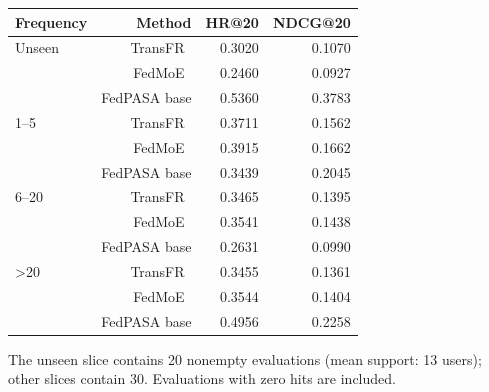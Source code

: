 
\par\noindent\begin{minipage}{\columnwidth}\centering\footnotesize
{}\label{tab:buckets}
\setlength{\tabcolsep}{2.5pt}
\begin{tabular*}{\linewidth}{@{\extracolsep{\fill}}lrrr@{}}
\toprule
Frequency & Method & HR@20 & NDCG@20 \\
\midrule
Unseen & TransFR~\citep{zhang2026transfr} & 0.3020 & 0.1070 \\
 & FedMoE~\citep{mei2024fedmoe} & 0.2460 & 0.0927 \\
 & FedPASA base & 0.5360 & 0.3783 \\
1--5 & TransFR~\citep{zhang2026transfr} & 0.3711 & 0.1562 \\
 & FedMoE~\citep{mei2024fedmoe} & 0.3915 & 0.1662 \\
 & FedPASA base & 0.3439 & 0.2045 \\
6--20 & TransFR~\citep{zhang2026transfr} & 0.3465 & 0.1395 \\
 & FedMoE~\citep{mei2024fedmoe} & 0.3541 & 0.1438 \\
 & FedPASA base & 0.2631 & 0.0990 \\
>20 & TransFR~\citep{zhang2026transfr} & 0.3455 & 0.1361 \\
 & FedMoE~\citep{mei2024fedmoe} & 0.3544 & 0.1404 \\
 & FedPASA base & 0.4956 & 0.2258 \\
\bottomrule
\end{tabular*}
\end{minipage}\par\addvspace{6pt}
\noindent The unseen slice contains 20 nonempty evaluations (mean support: 13 users); other slices contain 30. Evaluations with zero hits are included.\par




